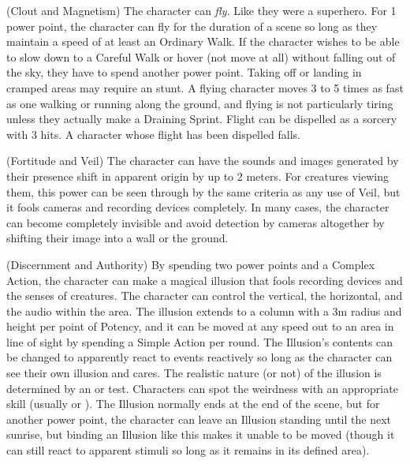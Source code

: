  (Clout and Magnetism)
The character can \textit{fly}. Like they were a superhero. For 1 power point, the character can fly for the duration of a scene so long as they maintain a speed of at least an Ordinary Walk. If the character wishes to be able to slow down to a Careful Walk or hover (not move at all) without falling out of the sky, they have to spend another power point. Taking off or landing in cramped areas may require an  stunt. A flying character moves 3 to 5 times as fast as one walking or running along the ground, and flying is not particularly tiring unless they actually make a Draining Sprint. Flight can be dispelled as a sorcery with 3 hits. A character whose flight has been dispelled falls.

 (Fortitude and Veil)
The character can have the sounds and images generated by their presence shift in apparent origin by up to 2 meters. For creatures viewing them, this power can be seen through by the same criteria as any use of Veil, but it fools cameras and recording devices completely. In many cases, the character can become completely invisible and avoid detection by cameras altogether by shifting their image into a wall or the ground.

 (Discernment and Authority)
By spending two power points and a Complex Action, the character can make a magical illusion that fools recording devices and the senses of creatures. The character can control the vertical, the horizontal, and the audio within the area. The illusion extends to a column with a 3m radius and height per point of Potency, and it can be moved at any speed out to an area in line of sight by spending a Simple Action per round. The Illusion's contents can be changed to apparently react to events reactively so long as the character can see their own illusion and cares. The realistic nature (or not) of the illusion is determined by an  or  test. Characters can spot the weirdness with an appropriate skill (usually  or ). The Illusion normally ends at the end of the scene, but for another power point, the character can leave an Illusion standing until the next sunrise, but binding an Illusion like this makes it unable to be moved (though it can still react to apparent stimuli so long as it remains in its defined area).

